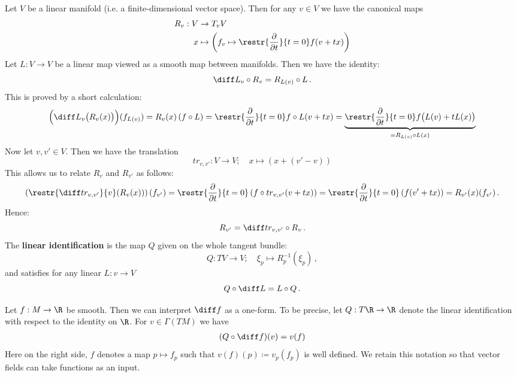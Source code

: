 	
	\begin{definition}\label{def:vb-linearIdentification}
	Let $V$ be a linear manifold (i.e. a finite-dimensional vector space). Then for any $v\in V$ we have the canonical maps
	\begin{align*}
		R_v:V&\to T_vV\,\\
		x&\mapsto \left(f_v\mapsto \restr{\frac{\partial }{\partial t}}{t=0}f(v+tx)\right)
	\end{align*}
	Let $L:V\to V$ be a linear map viewed as a smooth map between manifolds. Then we have the identity:
	\begin{equation*}
		{\diff L}_{v} \circ R_v =R_{L(v)}\circ L\,.
	\end{equation*} This is proved by a short calculation:
	\begin{equation*}
		\Big({\diff L}_{v} \big( R_v(x)\big)\Big)(f_{L(v)})=R_{v}(x)\left(f\circ L\right)=\restr{\frac{\partial }{\partial t}}{t=0}f\circ L(v+tx)=\underbrace{\restr{\frac{\partial }{\partial t}}{t=0}f\big( L(v)+tL(x)\big)}_{=R_{L(v)}\circ L(x)}
	\end{equation*} Now let $v,v'\in V$. Then we have the translation
	\begin{equation*}
		tr_{v,v'}: V\to V;\quad x\mapsto (x+(v'-v))
	\end{equation*} This allows us to relate $R_v$ and $R_{v'}$ as follows:
	\begin{equation*}
		\left(\restr{\diff tr_{v,v'}}{v}(R_v(x))\right)(f_{v'})=\restr{\frac{\partial }{\partial t}}{t=0}\left(f\circ tr_{v,v'}(v+tx)\right)=\restr{\frac{\partial }{\partial t}}{t=0}\left(f(v'+tx)\right)=R_{v'}(x)(f_{v'}) \,.
	\end{equation*} Hence:
	\begin{equation*}
		R_{v'}=\diff tr_{v,v'}\circ R_v\,.
	\end{equation*} 
	The \textbf{linear identification } is the map $Q$ given on the whole tangent bundle:
	\begin{equation*}
		Q:TV\to V;\quad \xi_p \mapsto R_p^{-1}(\xi_p)\,,
	\end{equation*} and satisfies for any linear $L : v\to V$ 
	\begin{equation*}
		Q\circ \diff L=L\circ Q\,.
	\end{equation*}
\end{definition}

	\begin{corollary}\label{cor:vb-vectorFieldsTakeFunctions}
		Let $f:M\to \R$ be smooth. Then we can interpret $\diff f$ as a one-form. To be precise, let $Q : T\R\to \R$ denote the linear identification with respect to the identity on $\R$. For $v\in \Gamma( TM)$ we have
		\begin{align*}
			(Q\circ \diff f)(v)=v(f)
		\end{align*} Here on the right side, $f$ denotes a map $p\mapsto f_p$ such that $v(f)(p)\coloneq v_p(f_p)$ is well defined. We retain this notation so that vector fields can take functions as an input.
	\end{corollary}

